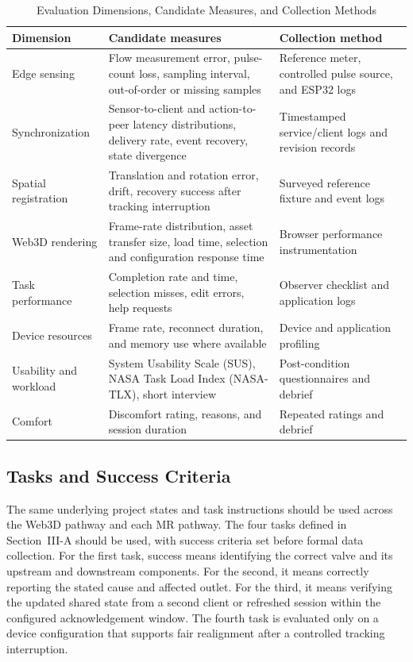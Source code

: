\documentclass[conference]{IEEEtran}
\begin{document}
\begin{table}[t]
\caption{Evaluation Dimensions, Candidate Measures, and Collection Methods}
\label{tab:measures}
\centering
\small
\begin{tabularx}{\textwidth}{p{}p{}Y}
\toprule
\textbf{Dimension} & \textbf{Candidate measures} & \textbf{Collection method}\\
\midrule
Edge sensing & Flow measurement error, pulse-count loss, sampling interval, out-of-order or missing samples & Reference meter, controlled pulse source, and ESP32 logs\\
Synchronization & Sensor-to-client and action-to-peer latency distributions, delivery rate, event recovery, state divergence & Timestamped service/client logs and revision records\\
Spatial registration & Translation and rotation error, drift, recovery success after tracking interruption & Surveyed reference fixture and event logs\\
Web3D rendering & Frame-rate distribution, asset transfer size, load time, selection and configuration response time & Browser performance instrumentation\\
Task performance & Completion rate and time, selection misses, edit errors, help requests & Observer checklist and application logs\\
Device resources & Frame rate, reconnect duration, and memory use where available & Device and application profiling\\
Usability and workload & System Usability Scale (SUS), NASA Task Load Index (NASA-TLX), short interview & Post-condition questionnaires and debrief\\
Comfort & Discomfort rating, reasons, and session duration & Repeated ratings and debrief\\
\bottomrule
\end{tabularx}
\end{table}

\subsection{Tasks and Success Criteria}
The same underlying project states and task instructions should be used across the Web3D pathway and each MR pathway. The four tasks defined in Section~III-A should be used, with success criteria set before formal data collection. For the first task, success means identifying the correct valve and its upstream and downstream components. For the second, it means correctly reporting the stated cause and affected outlet. For the third, it means verifying the updated shared state from a second client or refreshed session within the configured acknowledgement window. The fourth task is evaluated only on a device configuration that supports fair realignment after a controlled tracking interruption.
\end{document}
